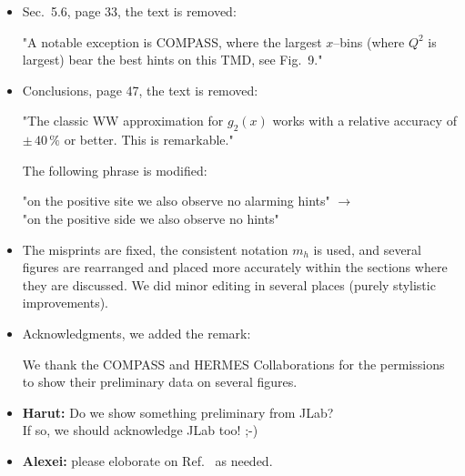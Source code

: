 \documentclass[a4paper,11pt]{article}
\begin{document}
\begin{itemize}
\item
Sec.~5.6, page 33, the text is removed:

 "A notable exception is COMPASS, where the largest $x$--bins
 (where $Q^2$ is largest) bear the best hints on this TMD,
 see Fig.~9."

\item
Conclusions, page 47, the text is removed:

 "The classic WW approximation for $g_2(x)$ works with a relative
 accuracy of $\pm\,40\,\%$ or better. This is remarkable."

 The following phrase is modified:

 "on the positive site we also observe no alarming hints" $\to$\\
 "on the positive side we also observe no hints" 

\item 
The misprints are fixed, the consistent notation $m_h$ is used,
and several figures are rearranged and placed more accurately 
within the sections where they are discussed. We did minor
editing in several places (purely stylistic improvements).


\item   Acknowledgments, we added the remark:

We thank the COMPASS and HERMES Collaborations for the 
permissions to show their preliminary data on several figures.

\item	{\bf Harut:} Do we show something preliminary from JLab?\\
	If so, we should acknowledge JLab too!  ;-)

\item	{\bf Alexei:} please eloborate on Ref.~\cite{Mathematica}
	as needed.

\end{itemize}

%
%
%
%
%
% 
%
%
\end{document}
